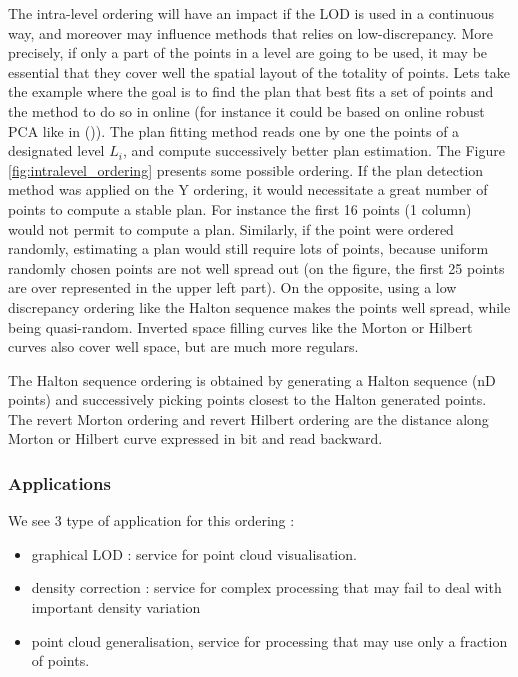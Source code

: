 		
		The intra-level ordering will have an impact if the LOD is used in a continuous way,
		and moreover may influence methods that relies on low-discrepancy.
		More precisely, if only a part of the points in a level are going to be used,
		it may be essential that they cover well the spatial layout of the totality of points.
		Lets take the example where the goal is to find the plan that best fits a set of points
		and the method to do so in online (for instance it could be based on online robust PCA like in (\cite{Feng2013})).
		The plan fitting method reads one by one the points of a designated level $L_i$, and compute successively better plan estimation.
		The Figure \ref{fig:intralevel_ordering} presents some possible ordering. 
		If the plan detection method was applied on the Y ordering, it would necessitate a great number of points to compute a stable plan. For instance the first 16 points (1 column) would not permit to compute a plan.
		Similarly, if the point were ordered randomly, estimating a plan would still require lots of points, because uniform randomly chosen points are not well spread out (on the figure, the first 25 points are over represented in the upper left part).
		On the opposite, using a low discrepancy ordering like the Halton sequence makes the points well spread, while being quasi-random.
		Inverted space filling curves like the Morton or Hilbert curves also cover well space, but are much more regulars.
		
		The Halton sequence ordering is obtained by generating a Halton sequence (nD points) and successively picking points closest to the Halton generated points.
		The revert Morton ordering and revert Hilbert ordering are the distance along Morton or Hilbert curve expressed in bit and read backward.
		
		
		\subsubsection{Applications}
			We see 3 type of application for this ordering :
			\begin{itemize}
				\item graphical LOD : service for point cloud visualisation.
				\item density correction : service for complex processing that may fail to deal with important density variation
				\item point cloud generalisation, service for processing that may use only a fraction of points.
			\end{itemize}	
			
